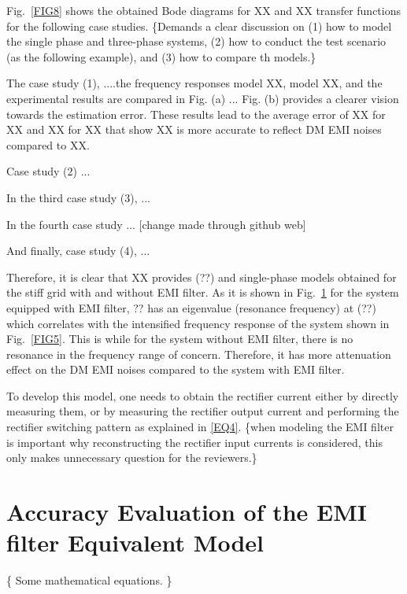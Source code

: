 \documentclass[journal,a4paper,10pt,twoside]{IEEEtran} %
\begin{document}
    
    
    
    
    Fig.~\ref{FIG8} shows the obtained Bode diagrams for XX and XX transfer functions for the following case studies. {\color{red} \{Demands a clear discussion on (1) how to model the single phase and three-phase systems, (2) how to conduct the test scenario (as the following example), and (3) how to compare th models.\}}
	
	
	The case study (1), ....the frequency responses model XX, model XX, and the experimental results are compared in Fig. (a) ... Fig. (b) provides a clearer vision towards the estimation error. These results lead to the average error of XX for XX and XX for XX that show XX is more accurate to reflect DM EMI noises compared to XX.
	
	Case study (2) ...
	
	In the third case study (3), ...
	
	In the fourth case study ... [change made through github web]
	
	And finally, case study (4), ...
	
	Therefore, it is clear that XX provides 
	(??) and single-phase models obtained for the stiff grid with and without EMI filter. As it is shown in Fig.~\ref{} for the system equipped with EMI filter, ?? has an eigenvalue (resonance frequency) at (??) which correlates with the intensified frequency response of the system shown in Fig.~\ref{FIG5}. This is while for the system without EMI filter, there is no resonance in the frequency range of concern. Therefore, it has more attenuation effect on the DM EMI noises compared to the system with EMI filter. 
	
	To develop this model, one needs to obtain the rectifier current either by directly measuring them, or by measuring the rectifier output current and performing the rectifier switching pattern as explained in \eqref{EQ4}. {\color{red} \{when modeling the EMI filter is important why reconstructing the rectifier input currents is considered, this only makes unnecessary question for the reviewers.\}}
	
	\section{Accuracy Evaluation of the EMI filter Equivalent Model}
	
	{\color{blue} \{ Some mathematical equations. \}} 
	
	
	
\end{document}
